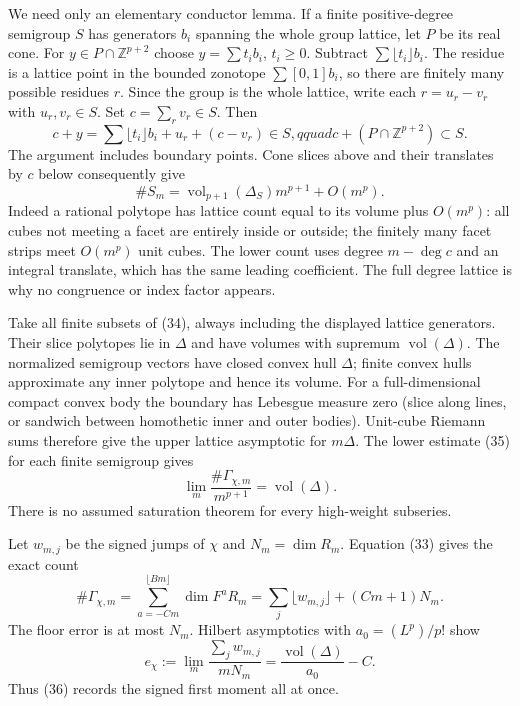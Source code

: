 \documentclass[
  10pt,
]{article}
\begin{document}
We need only an elementary conductor lemma. If a finite positive-degree
semigroup \(S\) has generators \(b_i\) spanning the whole group lattice,
let \(P\) be its real cone. For \(y\in P\cap\mathbb Z^{p+2}\) choose
\(y=\sum t_ib_i\), \(t_i\geq0\). Subtract
\(\sum\lfloor t_i\rfloor b_i\). The residue is a lattice point in the
bounded zonotope \(\sum[0,1]b_i\), so there are finitely many possible
residues \(r\). Since the group is the whole lattice, write each
\(r=u_r-v_r\) with \(u_r,v_r\in S\). Set \(c=\sum_rv_r\in S\). Then
\[ c+y=\sum\lfloor t_i\rfloor b_i+u_r+(c-v_r)\in S,qquad c+(P\cap\mathbb Z^{p+2})\subset S. \]
The argument includes boundary points. Cone slices above and their
translates by \(c\) below consequently give
\[ \#S_m=\operatorname{vol}_{p+1}(\Delta_S)m^{p+1}+O(m^p).                                    \tag{35}\]
Indeed a rational polytope has lattice count equal to its volume plus
\(O(m^p)\): all cubes not meeting a facet are entirely inside or
outside; the finitely many facet strips meet \(O(m^p)\) unit cubes. The
lower count uses degree \(m-\deg c\) and an integral translate, which
has the same leading coefficient. The full degree lattice is why no
congruence or index factor appears.

Take all finite subsets of (34), always including the displayed lattice
generators. Their slice polytopes lie in \(\Delta\) and have volumes
with supremum \(\operatorname{vol}(\Delta)\). The normalized semigroup
vectors have closed convex hull \(\Delta\); finite convex hulls
approximate any inner polytope and hence its volume. For a
full-dimensional compact convex body the boundary has Lebesgue measure
zero (slice along lines, or sandwich between homothetic inner and outer
bodies). Unit-cube Riemann sums therefore give the upper lattice
asymptotic for \(m\Delta\). The lower estimate (35) for each finite
semigroup gives
\[ \lim_m\frac{\#\Gamma_{\chi,m}}{m^{p+1}}=\operatorname{vol}(\Delta).                            \tag{36}\]
There is no assumed saturation theorem for every high-weight subseries.

Let \(w_{m,j}\) be the signed jumps of \(\chi\) and \(N_m=\dim R_m\).
Equation (33) gives the exact count
\[ \#\Gamma_{\chi,m}=\sum_{a=-Cm}^{\lfloor Bm\rfloor}\dim F^aR_m
       =\sum_j\lfloor w_{m,j}\rfloor+(Cm+1)N_m.                                                \tag{37}\]
The floor error is at most \(N_m\). Hilbert asymptotics with
\(a_0=(L^p)/p!\) show
\[ e_\chi:=\lim_m\frac{\sum_jw_{m,j}}{mN_m}=\frac{\operatorname{vol}(\Delta)}{a_0}-C.              \tag{38}\]
Thus (36) records the signed first moment all at once.
\end{document}
